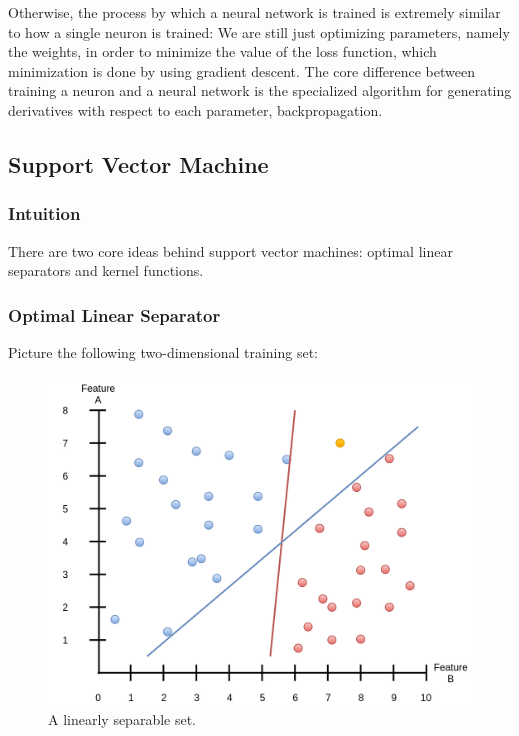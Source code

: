 \documentclass[a4paper, 12pt]{article}
\begin{document}
                        \par Otherwise, the process by which a neural network is trained is extremely similar to how a single neuron is trained: We are still just optimizing parameters, namely the weights, in order to minimize the value of the loss function, which minimization is done by using gradient descent. The core difference between training a neuron and a neural network is the specialized algorithm for generating derivatives with respect to each parameter, backpropagation.
                        
                      
                \newpage                  
                \subsection{Support Vector Machine}
                
                    \subsubsection{Intuition}
                    
                        \par There are two core ideas behind support vector machines: optimal linear separators and kernel functions.
                        
                    \subsubsection{Optimal Linear Separator}
                    
                        \par Picture the following two-dimensional training set:
                        
                        \begin{figure}[h]
                            \caption{A linearly separable set.}
                            \centering
                            \includegraphics[width=\textwidth]{poorClassifiers}
                        \end{figure}  
                        
\end{document}
